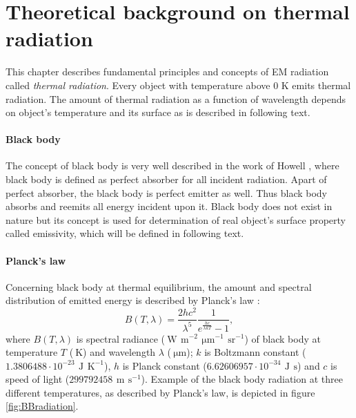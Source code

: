 \chapter{Theoretical background on thermal radiation}

This chapter describes fundamental principles and concepts of EM radiation called \textit{thermal radiation}. Every object with temperature above 0 K emits thermal radiation. The amount of thermal radiation as a function of wavelength depends on object's temperature and its surface as is described in following text.

\subsubsection*{Black body}
The concept of black body is very well described in the work of Howell \cite{H11}, where black body is defined as perfect absorber for all incident radiation. Apart of perfect absorber, the black body is perfect emitter as well. Thus black body absorbs and reemits all energy incident upon it. Black body does not exist in nature but its concept is used for determination of real object's surface property called emissivity, which will be defined in following text. 

\subsubsection*{Planck's law}
Concerning black body at thermal equilibrium, the amount and spectral distribution of emitted energy is described by Planck’s law \cite{P00}:
$$B(T,\lambda) = \frac{2hc^2}{\lambda^5}\frac{1}{e^{\frac{hc}{\lambda k T}}-1},$$
where $B(T,\lambda)$ is spectral radiance ($\SI{}{\watt}\,\SI{}{\meter}^{-2}\,\SI{}{\micro\meter}^{-1}\,\SI{}{\steradian}^{-1}$) of black body at temperature $T$ ($\SI{}{\kelvin}$) and wavelength $\lambda$ ($\SI{}{\micro\meter}$); $k$ is Boltzmann constant ($1.3806488\cdot10^{-23}\,\SI{}{\joule}\,\SI{}{\kelvin}^{-1}$), $h$ is Planck constant ($6.62606957\cdot10^{-34}\,\SI{}{\joule}\,\SI{}{\second}$) and $c$ is speed of light ($299792458\,\SI{}{\meter}\,\SI{}{\second}^{-1}$). Example of the black body radiation at three different temperatures, as described by Planck's law, is depicted in figure \ref{fig:BBradiation}.

